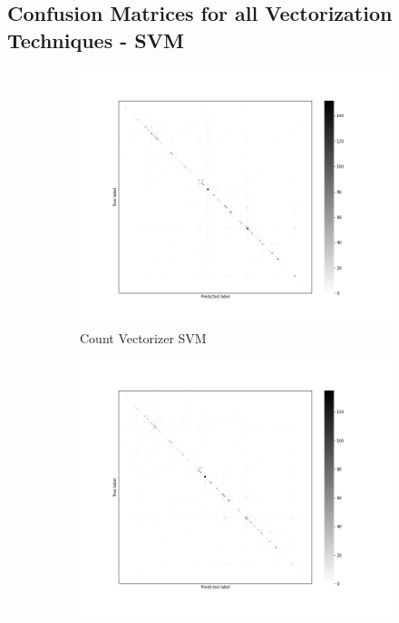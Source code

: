 \documentclass[12pt, a4paper, titlepage]{article}
\begin{document}
\newpage
\subsection*{Confusion Matrices for all Vectorization Techniques - SVM}
\begin{figure}[hb!]
  \centering
  \begin{subfigure}[b]{0.475\textwidth}  
    \centering 
    \includegraphics[width=\textwidth]{cm_count_SVM.jpg}
    {{\small Count Vectorizer SVM}}    
  \end{subfigure}
  \hfill
  \begin{subfigure}[b]{0.475\textwidth}   
      \centering 
      \includegraphics[width=\textwidth]{cm_bert_SVM.jpg}

\end{subfigure}
\end{figure}
\end{document}
